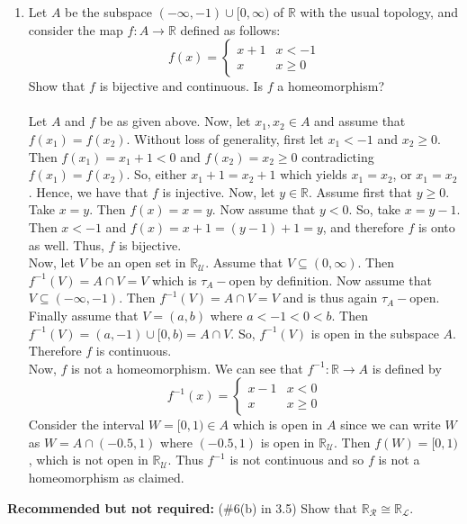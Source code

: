 \documentclass[12pt]{article}
\begin{document}
\begin{enumerate}
\item Let $A$ be the subspace $(-\infty,-1)\cup [0,\infty)$ of $\mathbb{R}$ with the usual topology, and consider the map $f:A\to \mathbb{R}$ defined as follows:
\[f(x)=\left\{ \begin{array}{ll}
                  x+1 & \mbox{$x<-1$}\\
                  x      & \mbox{$x\geq 0$}
                  \end{array}
          \right. \]
Show that $f$ is bijective and continuous. Is $f$ a homeomorphism?\\\\
Let $A$ and $f$ be as given above. Now, let $x_1,x_2\in A$ and assume that $f(x_1)=f(x_2)$. Without loss of generality, first let $x_1<-1$ and $x_2\geq0$. Then $f(x_1)=x_1+1<0$ and $f(x_2)=x_2\geq0$ contradicting $f(x_1)=f(x_2)$. So, either $x_1+1=x_2+1$ which yields $x_1=x_2$, or $x_1=x_2$. Hence, we have that $f$ is injective. Now, let $y\in\mathbb{R}$. Assume first that $y\geq0$. Take $x=y$. Then $f(x)=x=y$. Now assume that $y<0$. So, take $x=y-1$. Then $x<-1$ and  $f(x)=x+1=(y-1)+1=y$, and therefore $f$ is onto as well. Thus, $f$ is bijective.\\Now, let $V$ be an open set in $\mathbb{R}_{\mathcal{U}}$. Assume that $V\subseteq(0,\infty)$. Then $f^{-1}(V)=A\cap V=V$ which is $\tau_{A}-$open by definition. Now assume that $V\subseteq(-\infty,-1)$. Then $f^{-1}(V)=A\cap V=V$ and is thus again $\tau_{A}-$open. Finally assume that $V=(a,b)$ where $a<-1<0<b$. Then $f^{-1}(V)=(a,-1)\cup[0,b)=A\cap V$. So, $f^{-1}(V)$ is open in the subspace $A$. Therefore $f$ is continuous.\\Now, $f$ is not a homeomorphism. We can see that $f^{-1}:\mathbb{R}\rightarrow A$ is defined by \[f^{-1}(x)=\left\{ \begin{array}{ll}
                  x-1 & \mbox{$x<0$}\\
                  x      & \mbox{$x\geq 0$}
                  \end{array}
          \right. \]
Consider the interval $W=[0,1)\in A$ which is open in $A$ since we can write $W$ as $W=A\cap(-0.5,1)$ where $(-0.5,1)$ is open in $\mathbb{R}_{\mathcal{U}}$. Then $f(W)=[0,1)$, which is not open in $\mathbb{R}_{\mathcal{U}}$. Thus $f^{-1}$ is not continuous and so $f$ is not a homeomorphism as claimed.
\end{enumerate}

\textbf{Recommended but not required:} (\#6(b) in 3.5) Show that $\mathbb{R}_{\mathcal{R}}\cong \mathbb{R}_{\mathcal{L}}$. 
\end{document}

